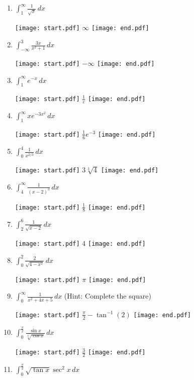 \documentclass[12pt]{article}
\begin{document}
\begin{enumerate}

\item $\int_{1}^{\infty}\frac{1}{\sqrt{x}}\,dx$ 

\texttt{[image: start.pdf]}
{{$\infty$}}
\texttt{[image: end.pdf]}


\item $\int_{-\infty}^{3}\frac{3x}{x^2+1}\,dx$ 

\texttt{[image: start.pdf]}
{{$-\infty$}}
\texttt{[image: end.pdf]}


\item $\int_{1}^{\infty}e^{-x}\,dx$ 

\texttt{[image: start.pdf]}
{{$\frac{1}{e}$}}
\texttt{[image: end.pdf]}


\item $\int_{1}^{\infty}xe^{-3x^2}\,dx$ 

\texttt{[image: start.pdf]}
{{$\frac{1}{6}e^{-3}$}}
\texttt{[image: end.pdf]}


\item $\int_{0}^{4}\frac{1}{x^{2/3}}\,dx$ 

\texttt{[image: start.pdf]}
{{$3\sqrt[3]{4}$}}
\texttt{[image: end.pdf]}


\item $\int_{4}^{\infty}\frac{1}{(x-2)^3}\,dx$ 

\texttt{[image: start.pdf]}
{{$\frac{1}{8}$}}
\texttt{[image: end.pdf]}


\item $\int_2^6 \frac{1}{\sqrt{x-2}} \,dx$

\texttt{[image: start.pdf]}
{{$4$}}
\texttt{[image: end.pdf]}


\item $\int_0^2 \frac{2}{\sqrt{4-x^2}} \,dx$

\texttt{[image: start.pdf]}
{{$\pi$}}
\texttt{[image: end.pdf]}


\item $\int_0^{\infty} \frac{1}{x^2+4x+5} \,dx$ (Hint: Complete the square)

\texttt{[image: start.pdf]}
{{$\frac{\pi}{2}-\tan^{-1}(2)$}}
\texttt{[image: end.pdf]}


\item $\int_0^{\frac{\pi}{2}} \frac{\sin{x}}{\sqrt[3]{\cos{x}}} \,dx$

\texttt{[image: start.pdf]}
{{$\frac{3}{2}$}}
\texttt{[image: end.pdf]}


\item $\int_{0}^{\frac{\pi}{2}} \sqrt{\tan{x}}\sec^2{x} \,dx$


\end{enumerate}
\end{document}
